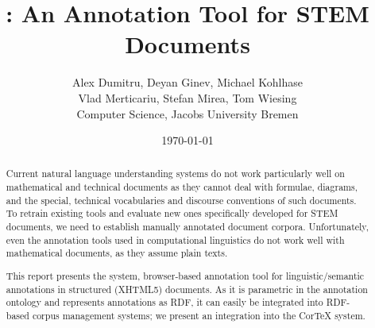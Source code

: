 \documentclass[a4paper, 12pt]{article}
\title{\KAT: An Annotation Tool for STEM Documents}
\author{Alex Dumitru, Deyan Ginev, Michael Kohlhase\\
  Vlad Merticariu, Stefan Mirea, Tom Wiesing\\[1ex]
Computer Science,  Jacobs University Bremen}
\date{\today}
\begin{document}
\maketitle
\begin{abstract}
  Current natural language understanding systems do not work particularly well on
  mathematical and technical documents as they cannot deal with formulae, diagrams, and
  the special, technical vocabularies and discourse conventions of such documents. To
  retrain existing tools and evaluate new ones specifically developed for STEM documents,
  we need to establish manually annotated document corpora. Unfortunately, even the
  annotation tools used in computational linguistics do not work well with mathematical
  documents, as they assume plain texts.

  This report presents the \sys system, browser-based annotation tool for
  linguistic/semantic annotations in structured (XHTML5) documents. As it is parametric in
  the annotation ontology and represents annotations as RDF, it can easily be integrated
  into RDF-based corpus management systems; we present an integration into the CorTeX
  system.
\end{abstract}

\thispagestyle{empty} \newpage
\tableofcontents\newpage







\newpage
\printbibliography\newpage
\appendix



\end{document}
